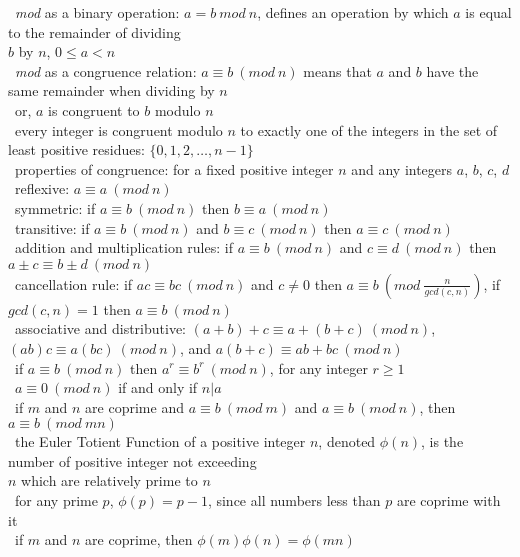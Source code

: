 \documentclass[10pt,letterpaper]{scrartcl}
\newcommand{\tbul}{\textbullet}
\newcommand{\tend}{\>\textendash}
\begin{document}
\begin{tabbing}
\tbul\ \textit{mod} as a binary operation: $a = b\ mod \ n $, defines an operation by which $a$ is equal to the remainder of dividing \\ $b$ by $n$, $0\leq a < n$ \\
\tbul\ \textit{mod} as a congruence relation: $a \equiv b\ (mod\ n)$ means that $a$ and $b$ have the same remainder when dividing by $n$ \\
    \tend\ or, $a$ is congruent to $b$ modulo $n$ \\
\tbul\ every integer is congruent modulo $n$ to exactly one of the integers in the set of least positive residues: $\{0,1,2,\ldots , n-1\}$ \\
\tbul\ properties of congruence: for a fixed positive integer $n$ and any integers $a$, $b$, $c$, $d$ \\
    \tend\ reflexive: $a\equiv a\ (mod\ n)$ \\
    \tend\ symmetric: if $a\equiv b\ (mod\ n)$ then $b\equiv a\ (mod\ n)$ \\
    \tend\ transitive: if $a\equiv b\ (mod\ n)$ and $b\equiv c\ (mod\ n)$ then $a\equiv c\ (mod\ n)$\\
    \tend\ addition and multiplication rules: if $a\equiv b\ (mod\ n)$ and $c\equiv d\ (mod\ n)$ then $a\pm c\equiv b\pm d\ (mod\ n)$ \\
    \tend\ cancellation rule: if $ac\equiv bc\ (mod\ n)$ and $c\neq 0$ then $a\equiv b\ (mod\ \frac{n}{gcd(c,n)})$, if $gcd(c,n)=1$ then $a\equiv b\ (mod\ n)$\\
    \tend\ associative and distributive: $(a+b)+c\equiv a+(b+c)\ (mod\ n)$, $(ab)c\equiv a(bc)\ (mod\ n)$, and $a(b+c)\equiv ab+bc\ (mod\ n)$\\
    \tend\ if $a\equiv b\ (mod\ n)$ then $a^r\equiv b^r\ (mod\ n)$, for any integer $r\geq 1$\\
    \tend\ $a\equiv 0\ (mod\ n)$ if and only if $n|a$\\
\tbul\ if $m$ and $n$ are coprime and $a\equiv b\ (mod\ m)$ and $a\equiv b\ (mod\ n)$, then $a\equiv b\ (mod\ mn)$ \\
\tbul\ the Euler Totient Function of a positive integer $n$, denoted $\phi (n)$, is the number of positive integer not exceeding \\ $n$ which are relatively prime to $n$ \\
\tbul\ for any prime $p$, $\phi (p)=p-1$, since all numbers less than $p$ are coprime with it \\
\tbul\ if $m$ and $n$ are coprime, then $\phi (m)\phi (n)=\phi (mn)$ \\

\end{tabbing}
\end{document}
